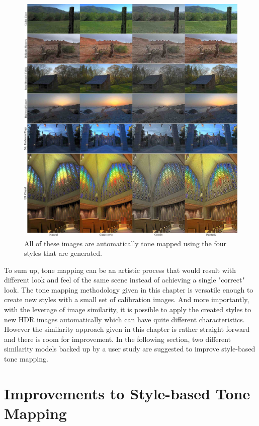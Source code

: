 \begin{figure}
\begin{center}
\includegraphics[width=\textwidth]{figures/chapter5/style_based/gallery_small.jpg}
\caption{All of these images are automatically tone mapped using the four styles that are generated.}
\label{fig:gallery}
\end{center}
\end{figure}

To sum up, tone mapping can be an artistic process that would result with different look and feel of the same scene instead of achieving a single "correct" look. The tone mapping methodology given in this chapter is versatile enough to create new styles with a small set of calibration images. And more importantly, with the leverage of image similarity, it is possible to apply the created styles to new HDR images automatically which can have quite different characteristics. However the similarity approach given in this chapter is rather straight forward and there is room for improvement. In the following section, two different similarity models backed up by a user study are suggested to improve style-based tone mapping.

\section{Improvements to Style-based Tone Mapping}
\label{sec:improvements}

